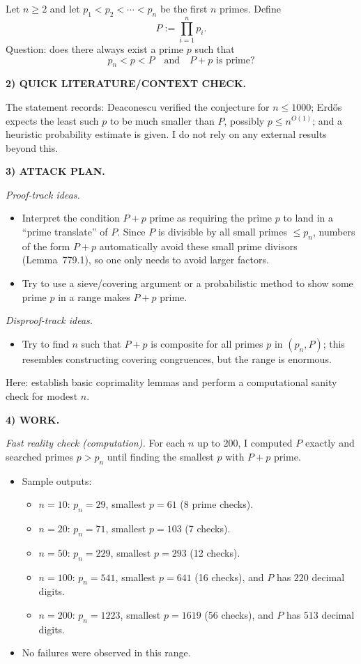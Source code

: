 Let $n\ge 2$ and let $p_1<p_2<\cdots<p_n$ be the first $n$ primes. Define
\[
P:=\prod_{i=1}^n p_i.
\]
Question: does there always exist a prime $p$ such that
\[
p_n < p < P\quad\text{and}\quad P+p\text{ is prime}?
\]

\medskip
\noindent\textbf{2) QUICK LITERATURE/CONTEXT CHECK.}

The statement records: Deaconescu verified the conjecture for $n\le 1000$; Erd\H{o}s expects the least such $p$ to be much smaller than $P$, possibly $p\le n^{O(1)}$; and a heuristic probability estimate is given. I do not rely on any external results beyond this.

\medskip
\noindent\textbf{3) ATTACK PLAN.}

\emph{Proof-track ideas.}
\begin{itemize}
\item Interpret the condition $P+p$ prime as requiring the prime $p$ to land in a ``prime translate'' of $P$. Since $P$ is divisible by all small primes $\le p_n$, numbers of the form $P+p$ automatically avoid these small prime divisors (Lemma~779.1), so one only needs to avoid larger factors.
\item Try to use a sieve/covering argument or a probabilistic method to show some prime $p$ in a range makes $P+p$ prime.
\end{itemize}
\emph{Disproof-track ideas.}
\begin{itemize}
\item Try to find $n$ such that $P+p$ is composite for all primes $p$ in $(p_n,P)$; this resembles constructing covering congruences, but the range is enormous.
\end{itemize}
Here: establish basic coprimality lemmas and perform a computational sanity check for modest $n$.

\medskip
\noindent\textbf{4) WORK.}

\noindent\emph{Fast reality check (computation).}
For each $n$ up to $200$, I computed $P$ exactly and searched primes $p>p_n$ until finding the smallest $p$ with $P+p$ prime.
\begin{itemize}
\item Sample outputs:
\begin{itemize}
\item $n=10$: $p_n=29$, smallest $p=61$ (8 prime checks).
\item $n=20$: $p_n=71$, smallest $p=103$ (7 checks).
\item $n=50$: $p_n=229$, smallest $p=293$ (12 checks).
\item $n=100$: $p_n=541$, smallest $p=641$ (16 checks), and $P$ has $220$ decimal digits.
\item $n=200$: $p_n=1223$, smallest $p=1619$ (56 checks), and $P$ has $513$ decimal digits.
\end{itemize}
\item No failures were observed in this range.
\end{itemize}

